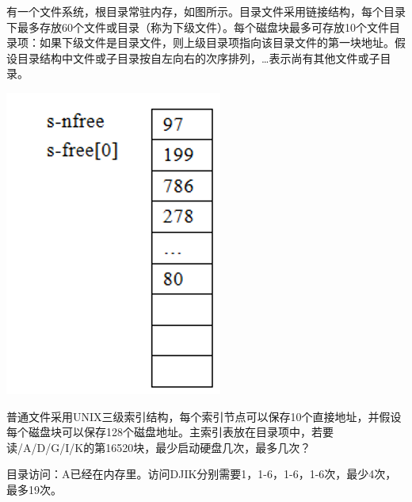 \documentclass{ctexart}
\begin{document}
\begin{outline}[enumerate]
\begin{minipage}[b]{0.7\textwidth}
        \1 有一个文件系统，根目录常驻内存，如图所示。目录文件采用链接结构，每个目录下最多存放60个文件或目录（称为下级文件）。每个磁盘块最多可存放10个文件目录项：如果下级文件是目录文件，则上级目录项指向该目录文件的第一块地址。假设目录结构中文件或子目录按自左向右的次序排列，…表示尚有其他文件或子目录。 
    \end{minipage}%
    \begin{minipage}[t]{0.3\textwidth}
        \includegraphics[width=\linewidth]{8-5.png}
    \end{minipage}
        \2 普通文件采用UNIX三级索引结构，每个索引节点可以保存10个直接地址，并假设每个磁盘块可以保存128个磁盘地址。主索引表放在目录项中，若要读/A/D/G/I/K的第16520块，最少启动硬盘几次，最多几次？

            目录访问：A已经在内存里。访问DJIK分别需要1，1-6，1-6，1-6次，最少4次，最多19次。
            

\end{outline}
\end{document}
